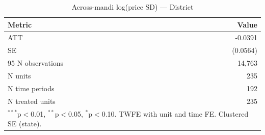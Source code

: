 \begin{table}[htbp]
\centering
\caption{Across-mandi log(price SD) — District}
\label{tab:spec2_across_district_pooled}
\begin{tabular}{lr}
\hline\hline
Metric & Value \\
\hline
ATT & -0.0391 \\
SE & (0.0564) \\
95%
N observations & 14,763 \\
N units & 235 \\
N time periods & 192 \\
N treated units & 235 \\
\hline\hline
\multicolumn{2}{l}{\footnotesize $^{***}$p$<$0.01, $^{**}$p$<$0.05, $^{*}$p$<$0.10. TWFE with unit and time FE. Clustered SE (state).} \\
\end{tabular}
\end{table}